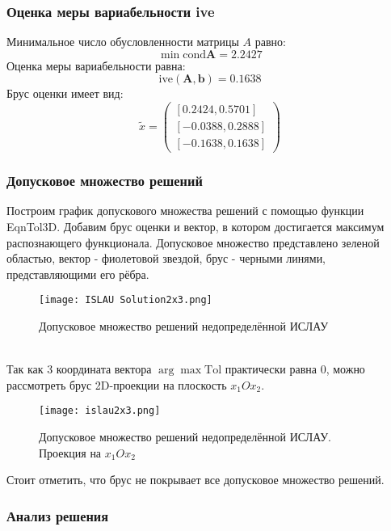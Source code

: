 \subsubsection{Оценка меры вариабельности ive}
Минимальное число обусловленности матрицы $A$ равно:
\begin{equation}
	\min \text{cond} \textbf{A} = 2.2427
\end{equation}
Оценка меры вариабельности равна:
\begin{equation}
	\text{ive}(\textbf{A}, \textbf{b}) = 0.1638
\end{equation}
Брус оценки имеет вид:
\begin{equation}
	\tilde{x} =
	\begin{pmatrix}
	    [0.2424, 0.5701] \\
		[-0.0388, 0.2888] \\
		[-0.1638, 0.1638]
	\end{pmatrix}
\end{equation}

\subsubsection{Допусковое множество решений}
Построим график допускового множества решений с помощью функции EqnTol3D. Добавим брус оценки и вектор, в котором достигается максимум распознающего функционала. Допусковое множество представлено зеленой областью, вектор - фиолетовой звездой, брус - черными линями, представляющими его рёбра. \\
\begin{figure}[h]
	\centering
	\texttt{[image: ISLAU Solution2x3.png]}
	\caption{Допусковое множество решений недопределённой ИСЛАУ}
\end{figure} \\
Так как 3 координата вектора $\arg \max \text{Tol}$ практически равна 0, можно рассмотреть брус 2D-проекции на плоскость $x_1 O x_2$. \\
\newpage
\begin{figure}[h]
	\centering
	\texttt{[image: islau2x3.png]}
	\caption{Допусковое множество решений недопределённой ИСЛАУ. Проекция на $x_1 O x_2$}
\end{figure}
Стоит отметить, что брус не покрывает все допусковое множество решений. \\

\subsubsection{Анализ решения}

